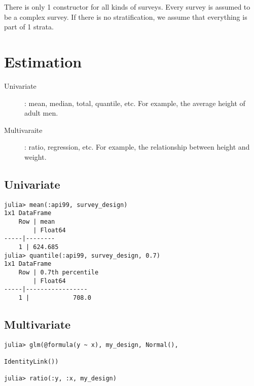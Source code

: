 \documentclass{juliacon}
\begin{document}
There is only 1 constructor for all kinds of surveys. Every survey is assumed to be a complex survey. If there is no stratification, we assume that everything is part of 1 strata. 




\section{Estimation}

\begin{description}
    \item[Univariate]: mean, median, total, quantile, etc. For example, the average height of adult men. 
    \item[Multivaraite]: ratio, regression, etc. For example, the relationship between height and weight. 
\end{description}

\subsection{Univariate}
\begin{lstlisting}
julia> mean(:api99, survey_design)
1x1 DataFrame
    Row | mean
        | Float64
-----|--------
    1 | 624.685
julia> quantile(:api99, survey_design, 0.7)
1x1 DataFrame
    Row | 0.7th percentile 
        | Float64          
-----|-----------------
    1 |            708.0
\end{lstlisting}

\subsection{Multivariate}
\begin{lstlisting}
julia> glm(@formula(y ~ x), my_design, Normal(),

IdentityLink())

julia> ratio(:y, :x, my_design)
\end{lstlisting}
\end{document}
